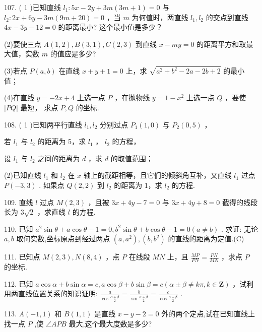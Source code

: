 \documentclass[10pt]{article}
\newcommand*\circled[1]{\tikz[baseline=(char.base)]{\node[shape=circle,draw,inner sep=1.5pt] (char) {\small #1};}}
\begin{document}
107. ( 1 )已知直线 \({l}_{1} : {5x} - {2y} + {3m}\left( {{3m} + 1}\right)  = 0\) 与 \({l}_{2} : {2x} + {6y} - {3m}\left( {{9m} + {20}}\right)  = 0\) ，当 \(m\) 为何值时，两直线 \({l}_{1},{l}_{2}\) 的交点到直线 \({4x} - {3y} - {12} = 0\) 的距离最小? 这个最小值是多少？

(2)要使三点 \(A\left( {1,2}\right) ,B\left( {3,1}\right) ,C\left( {2,3}\right)\) 到直线 \(x - {my} = 0\) 的距离平方和取最大值，实数 \(m\) 的值应是多少?

(3)若点 \(P\left( {a,b}\right)\) 在直线 \(x + y + 1 = 0\) 上，求 \(\sqrt{{a}^{2} + {b}^{2} - {2a} - {2b} + 2}\) 的最小值；

(4)在直线 \(y =  - {2x} + 4\) 上选一点 \(P\) ，在抛物线 \(y = 1 - {x}^{2}\) 上选一点 \(Q\) ，要使 \(\left| {PQ}\right|\) 最短， 求点 \(P,Q\) 的坐标.

108. ( 1 )已知两平行直线 \({l}_{1},{l}_{2}\) 分别过点 \({P}_{1}\left( {1,0}\right)\) 与 \({P}_{2}\left( {0,5}\right)\) ，

 \circled{1} 若 \({l}_{1}\) 与 \({l}_{2}\) 的距离为 5，求 \({l}_{1}\) ， \({l}_{2}\) 的方程，

 \circled{2}  设 \({l}_{1}\) 与 \({l}_{2}\) 之间的距离为 \(d\) ，求 \(d\) 的取值范围；

(2)已知直线 \({l}_{1}\) 和 \({l}_{2}\) 在 \(x\) 轴上的截距相等，且它们的倾斜角互补，又直线 \({l}_{1}\) 过点 \(P\left( {-3,3}\right)\) . 如果点 \(Q\left( {2,2}\right)\) 到 \({l}_{2}\) 的距离为 1，求 \({l}_{2}\) 的方程.

109. 直线 \(l\) 过点 \(M\left( {2,3}\right)\) ，且被 \({3x} + {4y} - 7 = 0\) 与 \({3x} + {4y} + 8 = 0\) 截得的线段长为 \(3\sqrt{2}\) ，求直线 \(l\) 的方程.

110. 已知 \({a}^{2}\sin \theta  + a\cos \theta  - 1 = 0,{b}^{2}\sin \theta  + b\cos \theta  - 1 = 0\left( {a \neq  b}\right)\) . 求证: 无论 \(a,b\) 取何实数,坐标原点到经过两点 \(\left( {a,{a}^{2}}\right) ,\left( {b,{b}^{2}}\right)\) 的直线的距离为定值.(C)

111. 已知点 \(M\left( {2,3}\right) ,N\left( {8,4}\right)\) ，点 \(P\) 在线段 \({MN}\) 上，且 \(\frac{MP}{PN} = \frac{PN}{MN}\) ，求点 \(P\) 的坐标.

112. 已知 \(a\cos \alpha  + b\sin \alpha  = c,a\cos \beta  + b\sin \beta  = c\left( {\alpha  \pm  \beta  \neq  {k\pi },k \in  \mathbf{Z}}\right)\) ，试利用两直线位置关系的知识证明: \(\frac{a}{\cos \frac{\alpha  + \beta }{2}} = \frac{b}{\sin \frac{\alpha  + \beta }{2}} = \frac{c}{\cos \frac{\alpha  - \beta }{2}}\) .

113. \(A\left( {-1,1}\right)\) 和 \(B\left( {1,1}\right)\) 是直线 \(x - y - 2 = 0\) 外的两个定点,试在已知直线上找一点 \(P\) ,使 \(\angle {APB}\) 最大,这个最大度数是多少?
\end{document}
